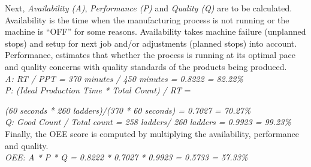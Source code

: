 \documentclass[runningheads]{llncs}
\begin{document}
Next, \emph{Availability (A)}, \emph{Performance (P)} and \emph{Quality (Q)} are to be calculated. Availability is the time when the manufacturing process is not running or the machine is ``OFF'' for some reasons. Availability takes machine failure (unplanned stops) and setup for next job and/or adjustments (planned stops) into account. Performance, estimates that whether the process is running at its optimal pace and quality concerns with quality standards of the products being produced.\\


\emph{A: RT / PPT = 370 minutes / 450 minutes = 0.8222 = 82.22\%}\\

\emph{P: (Ideal Production Time * Total Count) / RT} = 

\hspace{12mm} \emph{(60 seconds * 260 ladders)/(370 * 60 seconds) = 0.7027 = 70.27\%}\\

\emph{Q: Good Count / Total count = 258 ladders/ 260 ladders = 0.9923 = 99.23\%}\\

\iffalse
Finally, the OEE score is computed by multiplying the availability, performance and quality. An OEE score of 57.33\% is fairly typical for automate manufacturing industry, however, it indicates there is significant opportunity for improvement in performance. The performance score can be improved by reducing the switch over time between the jobs, by identifying the reasons for machine stops and finally by tackling the major cause(s) of downtime and so on. An OEE score around 85\% is considered a world class for automate manufacturing, where as, an OEE score of 40\% or below is considered low.\\ 

\emph{OEE: A * P * Q = 0.8222 * 0.7027 * 0.9923 = 0.5733 = 57.33\%}\\
\fi

Finally, the OEE score is computed by multiplying the availability, performance and quality.\\ 

\emph{OEE: A * P * Q = 0.8222 * 0.7027 * 0.9923 = 0.5733 = 57.33\%}\\
\end{document}
